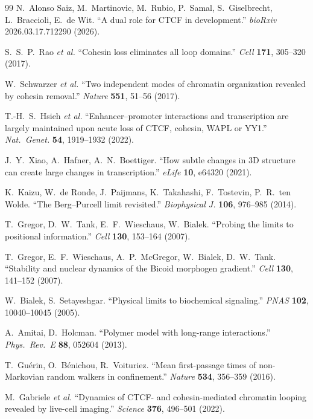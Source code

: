 \documentclass[11pt]{article}
\begin{document}
\begin{thebibliography}{99}
N.~Alonso Saiz, M.~Martinovic, M.~Rubio, P.~Samal, S.~Giselbrecht,
L.~Braccioli, E.~de Wit. ``A dual role for CTCF in development.''
\textit{bioRxiv} 2026.03.17.712290 (2026).

S.~S.~P.~Rao \textit{et al.} ``Cohesin loss eliminates all loop domains.''
\textit{Cell} \textbf{171}, 305--320 (2017).

W.~Schwarzer \textit{et al.} ``Two independent modes of chromatin
organization revealed by cohesin removal.''
\textit{Nature} \textbf{551}, 51--56 (2017).

T.-H.~S.~Hsieh \textit{et al.} ``Enhancer--promoter interactions and
transcription are largely maintained upon acute loss of CTCF, cohesin,
WAPL or YY1.'' \textit{Nat.\ Genet.} \textbf{54}, 1919--1932 (2022).

J.~Y.~Xiao, A.~Hafner, A.~N.~Boettiger. ``How subtle changes in 3D
structure can create large changes in transcription.''
\textit{eLife} \textbf{10}, e64320 (2021).

K.~Kaizu, W.~de Ronde, J.~Paijmans, K.~Takahashi, F.~Tostevin,
P.~R.~ten Wolde. ``The Berg--Purcell limit revisited.''
\textit{Biophysical J.} \textbf{106}, 976--985 (2014).

T.~Gregor, D.~W.~Tank, E.~F.~Wieschaus, W.~Bialek. ``Probing the limits to
positional information.'' \textit{Cell} \textbf{130}, 153--164 (2007).

T.~Gregor, E.~F.~Wieschaus, A.~P.~McGregor, W.~Bialek, D.~W.~Tank.
``Stability and nuclear dynamics of the Bicoid morphogen gradient.''
\textit{Cell} \textbf{130}, 141--152 (2007).

W.~Bialek, S.~Setayeshgar. ``Physical limits to biochemical signaling.''
\textit{PNAS} \textbf{102}, 10040--10045 (2005).

A.~Amitai, D.~Holcman. ``Polymer model with long-range interactions.''
\textit{Phys.\ Rev.\ E} \textbf{88}, 052604 (2013).

T.~Gu\'erin, O.~B\'enichou, R.~Voituriez. ``Mean first-passage times of
non-Markovian random walkers in confinement.'' \textit{Nature} \textbf{534},
356--359 (2016).

M.~Gabriele \textit{et al.} ``Dynamics of CTCF- and cohesin-mediated
chromatin looping revealed by live-cell imaging.''
\textit{Science} \textbf{376}, 496--501 (2022).


\end{thebibliography}
\end{document}
